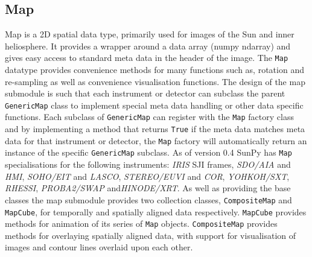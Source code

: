 	\subsection{Map}
	Map is a 2D spatial data type, primarily used for images of the Sun and 
	inner heliosphere. It provides a wrapper around a data array (numpy 
	ndarray) and gives easy access to standard meta data in the header of the 
	image.
	The \texttt{Map} datatype provides convenience methods for many functions 
	such as, rotation and re-sampling as well as convenience visualisation 
	functions.
	The design of the map submodule is such that each instrument or 
	detector can subclass the parent \texttt{GenericMap} class to implement 
	special meta data handling or other data specific functions. Each subclass 
	of \texttt{GenericMap} can register with the \texttt{Map} factory class and 
	by implementing a method that returns \texttt{True} if the meta data 
	matches meta data for that instrument or detector, the \texttt{Map} factory 
	will automatically return an instance of the specific \texttt{GenericMap} 
	subclass. As of version 0.4 SunPy has \texttt{Map} specialisations for the 
	following instruments: \textit{IRIS} SJI frames, \textit{SDO/AIA} and 
	\textit{HMI}, \textit{SOHO/EIT} and 	\textit{LASCO}, 
	\textit{STEREO/EUVI} 	and \textit{COR}, \textit{YOHKOH/SXT}, 
	\textit{RHESSI}, \textit{PROBA2/SWAP} and\textit{HINODE/XRT}.
	As well as providing the base classes the map submodule provides two 
	collection classes, \texttt{CompositeMap} and \texttt{MapCube}, for 
	temporally and spatially aligned data respectively. \texttt{MapCube} 
	provides methods for animation of its series of \texttt{Map} objects. 
	\texttt{CompositeMap} provides methods for overlaying spatially aligned 
	data, with support for visualisation of images and contour lines overlaid 
	upon each other.